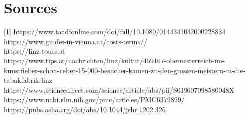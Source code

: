 \documentclass[12pt]{article}
\theoremstyle{definition}
\newenvironment{text}{
}{}
\begin{document}
\pagebreak
\section{Sources}
\begin{text}
 [1] https://www.tandfonline.com/doi/full/10.1080/0144341042000228834\\
 [2] https://www.guides-in-vienna.at/costs-terms//\\
 [3] https://linz-tours.at\\
 [4] https://www.tips.at/nachrichten/linz/kultur/459167-oberoesterreich-im-kunstfieber-schon-ueber-15-000-besucher-kamen-zu-den-grossen-meistern-in-die-tabakfabrik-linz\\
 [5] https://www.sciencedirect.com/science/article/abs/pii/S019607098580048X\\
 [6] https://www.ncbi.nlm.nih.gov/pmc/articles/PMC6379899/\\
 [7] https://pubs.asha.org/doi/abs/10.1044/jshr.1202.326\\
\end{text}
\end{document}
